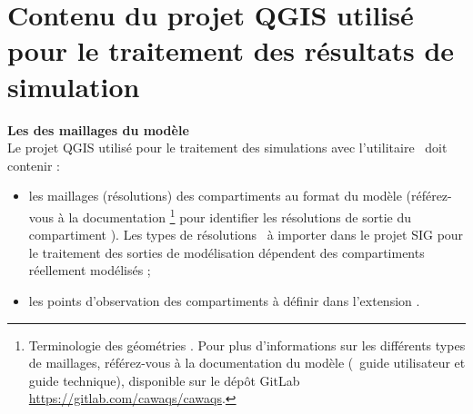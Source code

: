 
\section{Contenu du projet QGIS utilisé pour le traitement des résultats de simulation \cawaqs}
\label{sec-res-cawaqs}

\textbf{{Les  des maillages du modèle \cawaqs}}\\
Le projet QGIS utilisé pour le traitement des simulations avec l'utilitaire \cwv~doit contenir :
\begin{itemize}
    \item les maillages (résolutions) des compartiments au format  du modèle (référez-vous à la documentation \cawaqs\footnote{Terminologie des géométries \cawaqs. Pour plus d'informations sur les différents types de maillages, référez-vous à la documentation du modèle (\ie~guide utilisateur et guide technique), disponible sur le dépôt GitLab \href{https://gitlab.com/cawaqs/cawaqs}{https://gitlab.com/cawaqs/cawaqs}.} pour identifier les résolutions de sortie du compartiment ). Les types de résolutions \cawaqs~à importer dans le projet SIG pour le traitement des sorties de modélisation dépendent des compartiments réellement modélisés ;

    \item les points d'observation des compartiments à définir dans l'extension \cwv.
\end{itemize}

